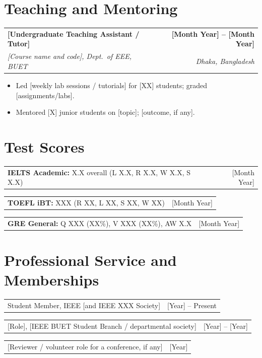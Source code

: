 \documentclass[11pt,letterpaper]{article}   %
\makeatletter
\newcommand{\entry}[4]{%
  \vspace{3pt}%
  \noindent\begin{tabularx}{\textwidth}{@{}X r@{}}
    \textbf{#1} & \textbf{#2}\\
    \textit{\textcolor{subtle}{#3}} & \textit{\textcolor{subtle}{#4}}\\
  \end{tabularx}%
  \vspace{-4pt}%
}
\newcommand{\lineentry}[2]{%
  \noindent\begin{tabularx}{\textwidth}{@{}X r@{}}
    #1 & #2\\
  \end{tabularx}%
}
\makeatother
\begin{document}
\section{Teaching and Mentoring}
\entry{[Undergraduate Teaching Assistant / Tutor]}{[Month Year] -- [Month Year]}
      {[Course name and code], Dept.\ of EEE, BUET}{Dhaka, Bangladesh}
\begin{itemize}
  \item Led [weekly lab sessions / tutorials] for [XX] students; graded [assignments/labs].
  \item Mentored [X] junior students on [topic]; [outcome, if any].
\end{itemize}

\section{Test Scores}
\lineentry{\textbf{IELTS Academic:} X.X overall (L X.X, R X.X, W X.X, S X.X) \hfill}{[Month Year]}
\lineentry{\textbf{TOEFL iBT:} XXX (R XX, L XX, S XX, W XX) \hfill}{[Month Year]}
\lineentry{\textbf{GRE General:} Q XXX (XX\%), V XXX (XX\%), AW X.X \hfill}{[Month Year]}

\section{Professional Service and Memberships}
\lineentry{Student Member, IEEE [and IEEE XXX Society] \hfill}{[Year] -- Present}
\lineentry{[Role], [IEEE BUET Student Branch / departmental society] \hfill}{[Year] -- [Year]}
\lineentry{[Reviewer / volunteer role for a conference, if any] \hfill}{[Year]}

\end{document}

